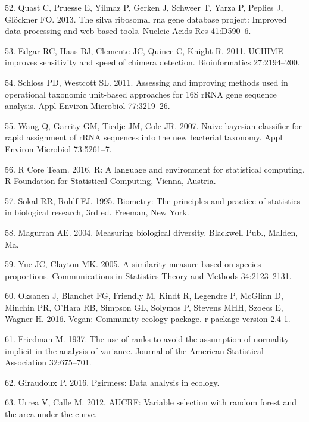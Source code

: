 \documentclass[12pt,]{article}
\begin{document}
\hypertarget{ref-Quast_silva_2013}{}
52. Quast C, Pruesse E, Yilmaz P, Gerken J, Schweer T, Yarza P, Peplies
J, Glöckner FO. 2013. The silva ribosomal rna gene database project:
Improved data processing and web-based tools. Nucleic Acids Res
41:D590--6.

\hypertarget{ref-edgar_uchime_2011}{}
53. Edgar RC, Haas BJ, Clemente JC, Quince C, Knight R. 2011. UCHIME
improves sensitivity and speed of chimera detection. Bioinformatics
27:2194--200.

\hypertarget{ref-schloss_OTUanalysis_2011}{}
54. Schloss PD, Westcott SL. 2011. Assessing and improving methods used
in operational taxonomic unit-based approaches for 16S rRNA gene
sequence analysis. Appl Environ Microbiol 77:3219--26.

\hypertarget{ref-wang_taxonomy_2007}{}
55. Wang Q, Garrity GM, Tiedje JM, Cole JR. 2007. Naive bayesian
classifier for rapid assignment of rRNA sequences into the new bacterial
taxonomy. Appl Environ Microbiol 73:5261--7.

\hypertarget{ref-R}{}
56. R Core Team. 2016. R: A language and environment for statistical
computing. R Foundation for Statistical Computing, Vienna, Austria.

\hypertarget{ref-sokal_biometrystats_1995}{}
57. Sokal RR, Rohlf FJ. 1995. Biometry: The principles and practice of
statistics in biological research, 3rd ed. Freeman, New York.

\hypertarget{ref-magurran_measuring_2004}{}
58. Magurran AE. 2004. Measuring biological diversity. Blackwell Pub.,
Malden, Ma.

\hypertarget{ref-yue_thetaYC_2005}{}
59. Yue JC, Clayton MK. 2005. A similarity measure based on species
proportions. Communications in Statistics-Theory and Methods
34:2123--2131.

\hypertarget{ref-oksanen_vegan_2016}{}
60. Oksanen J, Blanchet FG, Friendly M, Kindt R, Legendre P, McGlinn D,
Minchin PR, O'Hara RB, Simpson GL, Solymos P, Stevens MHH, Szoecs E,
Wagner H. 2016. Vegan: Community ecology package. r package version
2.4-1.

\hypertarget{ref-friedman_1937}{}
61. Friedman M. 1937. The use of ranks to avoid the assumption of
normality implicit in the analysis of variance. Journal of the American
Statistical Association 32:675--701.

\hypertarget{ref-pgirmess}{}
62. Giraudoux P. 2016. Pgirmess: Data analysis in ecology.

\hypertarget{ref-AUCRF}{}
63. Urrea V, Calle M. 2012. AUCRF: Variable selection with random forest
and the area under the curve.
\end{document}
